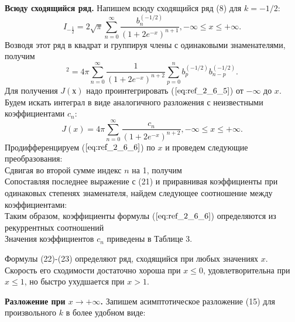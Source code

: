 \textbf{Всюду сходящийся ряд.} Напишем всюду сходящийся ряд (8) для $k = -1/2$:
\begin{equation}
I_{-\frac{1}{2}} = 2\sqrt{\pi} \sum\limits_{n=0}^{\infty} \frac{b_n^{(-1/2)}}{(1+2e^{-x})^{n+1}}, -\infty \leqslant x \leqslant +\infty.
\label{eq:ref_2_6_4}
\end{equation}
Возводя этот ряд в квадрат и группируя члены с одинаковыми знаменателями, получим
\begin{equation}
[I_{-\frac{1}{2}}]^2 = 4\pi \sum\limits_{n=0}^{\infty} \frac{1}{(1+2e^{-x})^{n+2}} \sum\limits_{p=0}^n b_p^{(-1/2)} b_{n-p}^{(-1/2)}.
\label{eq:ref_2_6_5}
\end{equation}
Для получения $J(х)$ надо проинтегрировать ($\ref{eq:ref_2_6_5}$) от $-\infty$ до $x$. Будем искать
интеграл в виде аналогичного разложения с неизвестными коэффициентами $c_n$:
\begin{equation}
J(x)=4\pi \sum_{n=0}^{\infty} \frac{c_n}{(1+2e^{-x})^{n+2}}, -\infty \leqslant x \leqslant +\infty.
\label{eq:ref_2_6_6}
\end{equation}
Продифференцируем ($\ref{eq:ref_2_6_6}$) по $x$ и проведем следующие преобразования:
\begin{equation}
\label{eq:ref_2_6_7}
\end{equation}
Сдвигая во второй сумме индекс $n$ на 1, получим
\begin{equation}
\label{eq:ref_2_6_8}
\end{equation}
Сопоставляя последнее выражение с (21) и приравнивая коэффициенты при
одинаковых степенях знаменателя, найдем следующее соотношение между
коэффициентами:
\begin{equation}
\label{eq:ref_2_6_9}
\end{equation}
Таким образом, коэффициенты формулы ($\ref{eq:ref_2_6_6}$) определяются из рекуррентных соотношений
\begin{equation}
\label{eq:ref_2_6_10}
\end{equation}
Значения коэффициентов $c_n$ приведены в Таблице 3.

Формулы (22)-(23) определяют ряд, сходящийся при любых значениях $x$.
Скорость его сходимости достаточно хороша при $x \leqslant 0$, удовлетворительна при
$x \leqslant 1$, но быстро ухудшается при $x > 1$.

\textbf{Разложение при $x \to +\infty$.} Запишем асимптотическое разложение (15) для
произвольного $k$ в более удобном виде:

